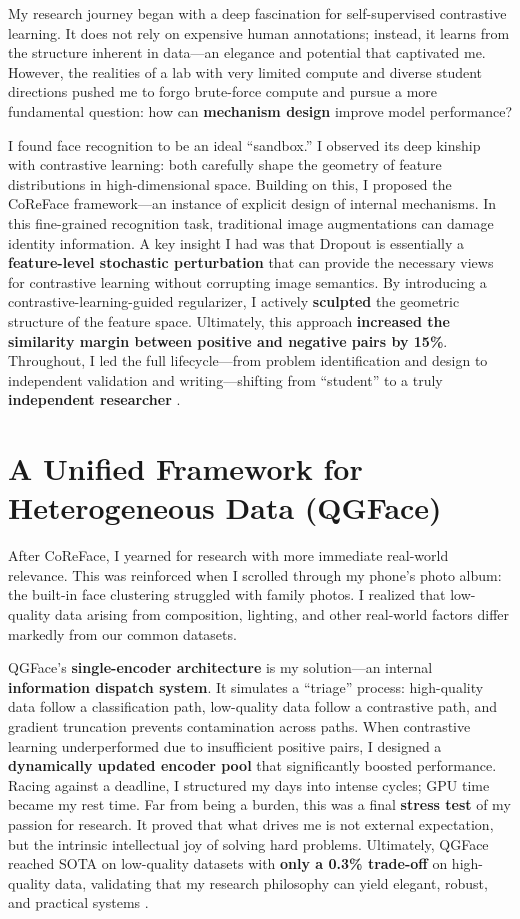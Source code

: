\documentclass[11pt, letterpaper]{article}
\begin{document}
My research journey began with a deep fascination for self-supervised contrastive learning. It does not rely on expensive human annotations; instead, it learns from the structure inherent in data—an elegance and potential that captivated me. However, the realities of a lab with very limited compute and diverse student directions pushed me to forgo brute-force compute and pursue a more fundamental question: how can \textbf{mechanism design} improve model performance?

I found face recognition to be an ideal “sandbox.” I observed its deep kinship with contrastive learning: both carefully shape the geometry of feature distributions in high-dimensional space. Building on this, I proposed the CoReFace framework—an instance of explicit design of internal mechanisms. In this fine-grained recognition task, traditional image augmentations can damage identity information. A key insight I had was that Dropout is essentially a \textbf{feature-level stochastic perturbation} that can provide the necessary views for contrastive learning without corrupting image semantics. By introducing a contrastive-learning-guided regularizer, I actively \textbf{sculpted} the geometric structure of the feature space. Ultimately, this approach \textbf{increased the similarity margin between positive and negative pairs by 15\%}. Throughout, I led the full lifecycle—from problem identification and design to independent validation and writing—shifting from “student” to a truly \textbf{independent researcher} \cite{coreface}.

\section{A Unified Framework for Heterogeneous Data (QGFace)}

After CoReFace, I yearned for research with more immediate real-world relevance. This was reinforced when I scrolled through my phone’s photo album: the built-in face clustering struggled with family photos. I realized that low-quality data arising from composition, lighting, and other real-world factors differ markedly from our common datasets.

QGFace’s \textbf{single-encoder architecture} is my solution—an internal \textbf{information dispatch system}. It simulates a “triage” process: high-quality data follow a classification path, low-quality data follow a contrastive path, and gradient truncation prevents contamination across paths. When contrastive learning underperformed due to insufficient positive pairs, I designed a \textbf{dynamically updated encoder pool} that significantly boosted performance. Racing against a deadline, I structured my days into intense cycles; GPU time became my rest time. Far from being a burden, this was a final \textbf{stress test} of my passion for research. It proved that what drives me is not external expectation, but the intrinsic intellectual joy of solving hard problems. Ultimately, QGFace reached SOTA on low-quality datasets with \textbf{only a 0.3\% trade-off} on high-quality data, validating that my research philosophy can yield elegant, robust, and practical systems \cite{qgface}.
\end{document}
